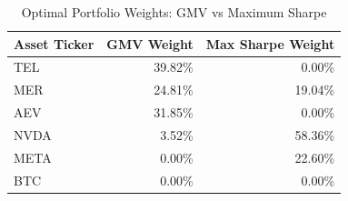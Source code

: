 \begin{table}[H]
\centering
\caption{\label{tab:optimal_weights}Optimal Portfolio Weights: GMV vs Maximum Sharpe}
\fontsize{9}{11}\selectfont
\begin{tabular}[t]{lrr}
\toprule
Asset Ticker & GMV Weight & Max Sharpe Weight\\
\midrule
TEL & 39.82\% & 0.00\%\\
MER & 24.81\% & 19.04\%\\
AEV & 31.85\% & 0.00\%\\
NVDA & 3.52\% & 58.36\%\\
META & 0.00\% & 22.60\%\\
BTC & 0.00\% & 0.00\%\\
\bottomrule
\end{tabular}
\end{table}
